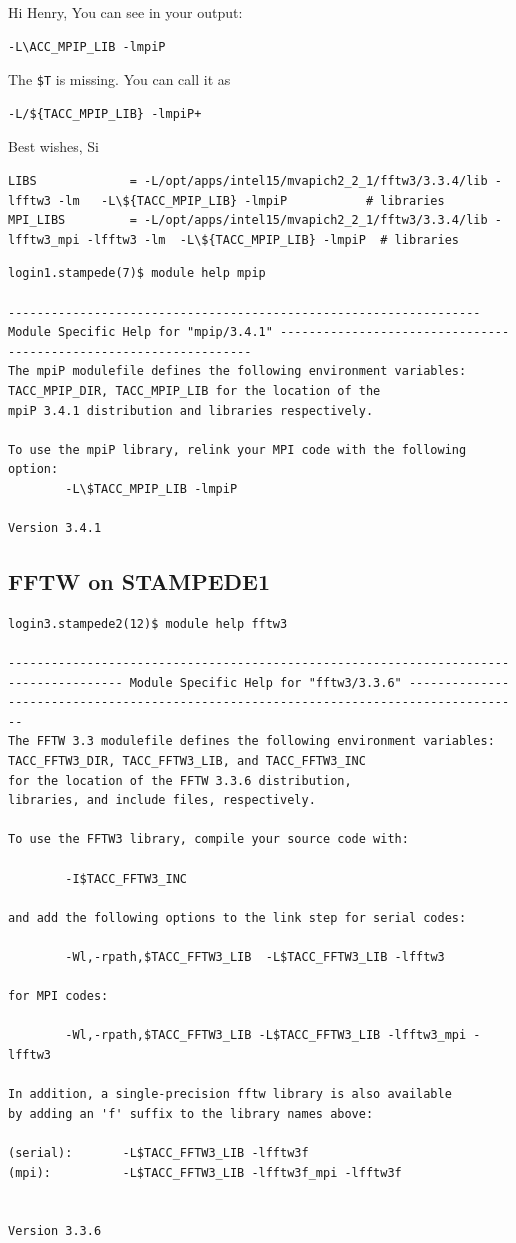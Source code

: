 \documentclass{article}
\begin{document}
Hi Henry, You can see in your output:
\scriptsize
\begin{verbatim}
-L\ACC_MPIP_LIB -lmpiP
\end{verbatim}
\normalsize
The \verb+$T+ is missing. You can call it as 
\scriptsize
\begin{verbatim}
-L/${TACC_MPIP_LIB} -lmpiP+
\end{verbatim}
\normalsize
Best wishes,
Si
\scriptsize
\begin{verbatim}
LIBS             = -L/opt/apps/intel15/mvapich2_2_1/fftw3/3.3.4/lib -lfftw3 -lm   -L\${TACC_MPIP_LIB} -lmpiP           # libraries
MPI_LIBS         = -L/opt/apps/intel15/mvapich2_2_1/fftw3/3.3.4/lib -lfftw3_mpi -lfftw3 -lm  -L\${TACC_MPIP_LIB} -lmpiP  # libraries 
\end{verbatim}
\normalsize
\scriptsize
\begin{verbatim}
login1.stampede(7)$ module help mpip

------------------------------------------------------------------ Module Specific Help for "mpip/3.4.1" ------------------------------------------------------------------
The mpiP modulefile defines the following environment variables:
TACC_MPIP_DIR, TACC_MPIP_LIB for the location of the
mpiP 3.4.1 distribution and libraries respectively.

To use the mpiP library, relink your MPI code with the following option:
        -L\$TACC_MPIP_LIB -lmpiP

Version 3.4.1
\end{verbatim}
\normalsize

\subsection{FFTW on STAMPEDE1}
\scriptsize
\begin{verbatim}
login3.stampede2(12)$ module help fftw3

-------------------------------------------------------------------------------------- Module Specific Help for "fftw3/3.3.6" --------------------------------------------------------------------------------------
The FFTW 3.3 modulefile defines the following environment variables:
TACC_FFTW3_DIR, TACC_FFTW3_LIB, and TACC_FFTW3_INC
for the location of the FFTW 3.3.6 distribution,
libraries, and include files, respectively.

To use the FFTW3 library, compile your source code with:

        -I$TACC_FFTW3_INC

and add the following options to the link step for serial codes:

        -Wl,-rpath,$TACC_FFTW3_LIB  -L$TACC_FFTW3_LIB -lfftw3

for MPI codes:

        -Wl,-rpath,$TACC_FFTW3_LIB -L$TACC_FFTW3_LIB -lfftw3_mpi -lfftw3

In addition, a single-precision fftw library is also available
by adding an 'f' suffix to the library names above:

(serial):       -L$TACC_FFTW3_LIB -lfftw3f
(mpi):          -L$TACC_FFTW3_LIB -lfftw3f_mpi -lfftw3f


Version 3.3.6
\end{verbatim}
\normalsize
\end{document}
